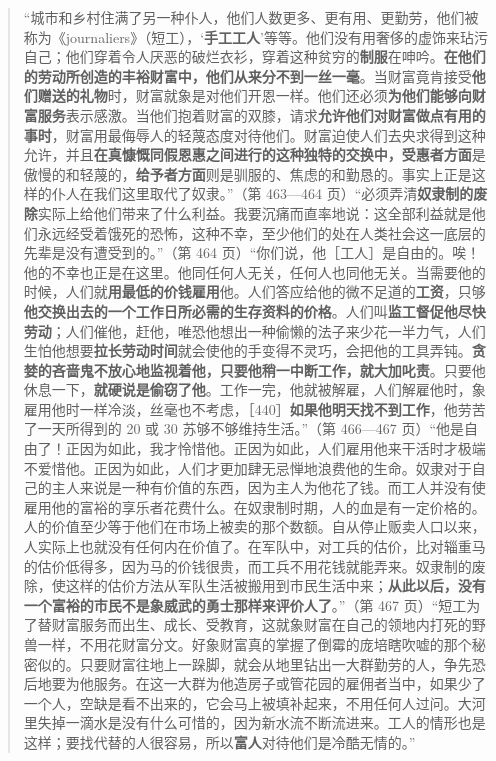 \begin{quote}“城市和乡村住满了另一种仆人，他们人数更多、更有用、更勤劳，他们被称为《journaliers》（短工），‘\textbf{手工工人}’等等。他们没有用奢侈的虚饰来玷污自己；他们穿着令人厌恶的破烂衣衫，穿着这种贫穷的\textbf{制服}在呻吟。\textbf{在他们的劳动所创造的丰裕财富中，他们从来分不到一丝一毫}。当财富竟肯接受\textbf{他们赠送的礼物}时，财富就象是对他们开恩一样。他们还必须\textbf{为他们能够向财富服务}表示感激。当他们抱着财富的双膝，请求\textbf{允许他们对财富做点有用的事时}，财富用最侮辱人的轻蔑态度对待他们。财富迫使人们去央求得到这种允许，并且\textbf{在真慷慨同假恩惠之间进行的这种独特的交换中，受惠者方面}是傲慢的和轻蔑的，\textbf{给予者方面}则是驯服的、焦虑的和勤恳的。事实上正是这样的仆人在我们这里取代了奴隶。”（第 463—464 页）“必须弄清\textbf{奴隶制的废除}实际上给他们带来了什么利益。我要沉痛而直率地说：这全部利益就是他们永远经受着饿死的恐怖，这种不幸，至少他们的处在人类社会这一底层的先辈是没有遭受到的。”（第 464 页）“你们说，他［工人］是自由的。唉！他的不幸也正是在这里。他同任何人无关，任何人也同他无关。当需要他的时候，人们就\textbf{用最低的价钱雇用}他。人们答应给他的微不足道的\textbf{工资}，只够\textbf{他交换出去的一个工作日所必需的生存资料的价格}。人们叫\textbf{监工督促他尽快劳动}；人们催他，赶他，唯恐他想出一种偷懒的法子来少花一半力气，人们生怕他想要\textbf{拉长劳动时间}就会使他的手变得不灵巧，会把他的工具弄钝。\textbf{贪婪的吝啬鬼不放心地监视着他，只要他稍一中断工作，就大加叱责}。只要他休息一下，\textbf{就硬说是偷窃了他}。工作一完，他就被解雇，人们解雇他时，象雇用他时一样冷淡，丝毫也不考虑，［440］\textbf{如果他明天找不到工作}，他劳苦了一天所得到的 20 或 30 苏够不够维持生活。”（第 466—467 页）“他是自由了！正因为如此，我才怜惜他。正因为如此，人们雇用他来干活时才极端不爱惜他。正因为如此，人们才更加肆无忌惮地浪费他的生命。奴隶对于自己的主人来说是一种有价值的东西，因为主人为他花了钱。而工人并没有使雇用他的富裕的享乐者花费什么。在奴隶制时期，人的血是有一定价格的。人的价值至少等于他们在市场上被卖的那个数额。自从停止贩卖人口以来，人实际上也就没有任何内在价值了。在军队中，对工兵的估价，比对辎重马的估价低得多，因为马的价钱很贵，而工兵不用花钱就能弄来。奴隶制的废除，使这样的估价方法从军队生活被搬用到市民生活中来；\textbf{从此以后，没有一个富裕的市民不是象威武的勇士那样来评价人了}。”（第 467 页）“短工为了替财富服务而出生、成长、受教育，这就象财富在自己的领地内打死的野兽一样，不用花财富分文。好象财富真的掌握了倒霉的庞培瞎吹嘘的那个秘密似的。只要财富往地上一跺脚，就会从地里钻出一大群勤劳的人，争先恐后地要为他服务。在这一大群为他造房子或管花园的雇佣者当中，如果少了一个人，空缺是看不出来的，它会马上被填补起来，不用任何人过问。大河里失掉一滴水是没有什么可惜的，因为新水流不断流进来。工人的情形也是这样；要找代替的人很容易，所以\textbf{富人}对待他们是冷酷无情的。”\end{quote}

